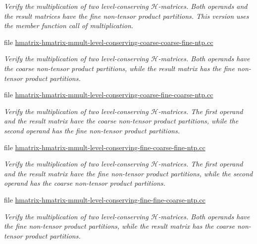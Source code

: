 \begin{DoxyCompactItemize}
\begin{DoxyCompactList}\small\item\em Verify the multiplication of two level-\/conserving $\mathcal{H}$-\/matrices. Both operands and the result matrices have the fine non-\/tensor product partitions. This version uses the member function call of multiplication. \end{DoxyCompactList}\item 
file \hyperlink{hmatrix-hmatrix-mmult-level-conserving-coarse-coarse-fine-ntp_8cc}{hmatrix-\/hmatrix-\/mmult-\/level-\/conserving-\/coarse-\/coarse-\/fine-\/ntp.\+cc}
\begin{DoxyCompactList}\small\item\em Verify the multiplication of two level-\/conserving $\mathcal{H}$-\/matrices. Both operands have the coarse non-\/tensor product partitions, while the result matrix has the fine non-\/tensor product partitions. \end{DoxyCompactList}\item 
file \hyperlink{hmatrix-hmatrix-mmult-level-conserving-coarse-fine-coarse-ntp_8cc}{hmatrix-\/hmatrix-\/mmult-\/level-\/conserving-\/coarse-\/fine-\/coarse-\/ntp.\+cc}
\begin{DoxyCompactList}\small\item\em Verify the multiplication of two level-\/conserving $\mathcal{H}$-\/matrices. The first operand and the result matrix have the coarse non-\/tensor product partitions, while the second operand has the fine non-\/tensor product partitions. \end{DoxyCompactList}\item 
file \hyperlink{hmatrix-hmatrix-mmult-level-conserving-fine-coarse-fine-ntp_8cc}{hmatrix-\/hmatrix-\/mmult-\/level-\/conserving-\/fine-\/coarse-\/fine-\/ntp.\+cc}
\begin{DoxyCompactList}\small\item\em Verify the multiplication of two level-\/conserving $\mathcal{H}$-\/matrices. The first operand and the result matrix have the fine non-\/tensor product partitions, while the second operand has the coarse non-\/tensor product partitions. \end{DoxyCompactList}\item 
file \hyperlink{hmatrix-hmatrix-mmult-level-conserving-fine-fine-coarse-ntp_8cc}{hmatrix-\/hmatrix-\/mmult-\/level-\/conserving-\/fine-\/fine-\/coarse-\/ntp.\+cc}
\begin{DoxyCompactList}\small\item\em Verify the multiplication of two level-\/conserving $\mathcal{H}$-\/matrices. Both operands have the fine non-\/tensor product partitions, while the result matrix has the coarse non-\/tensor product partitions. \end{DoxyCompactList}\item 

\end{DoxyCompactItemize}

